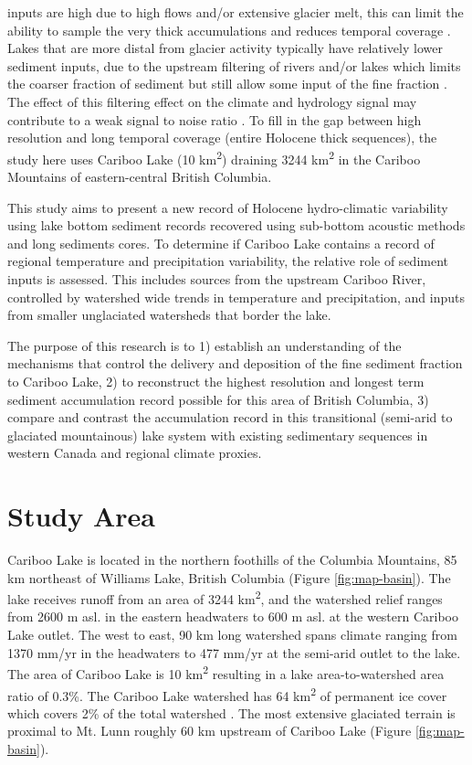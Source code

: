 \documentclass[Royal,times,doublespace,sageh]{sagej}
\begin{document}
inputs are high due to high flows and/or extensive glacier melt, this
can limit the ability to sample the very thick accumulations and reduces
temporal coverage \citep[e.g.][]{Desloges1994d}. Lakes that are more
distal from glacier activity typically have relatively lower sediment
inputs, due to the upstream filtering of rivers and/or lakes which
limits the coarser fraction of sediment but still allow some input of
the fine fraction \citep{Hodder2007}. The effect of this filtering
effect on the climate and hydrology signal may contribute to a weak
signal to noise ratio \citep{Jerolmack2010}. To fill in the gap between
high resolution and long temporal coverage (entire Holocene thick
sequences), the study here uses Cariboo Lake (10 km\textsuperscript{2})
draining 3244 km\textsuperscript{2} in the Cariboo Mountains of
eastern-central British Columbia.

This study aims to present a new record of Holocene hydro-climatic
variability using lake bottom sediment records recovered using
sub-bottom acoustic methods and long sediments cores. To determine if
Cariboo Lake contains a record of regional temperature and precipitation
variability, the relative role of sediment inputs is assessed. This
includes sources from the upstream Cariboo River, controlled by
watershed wide trends in temperature and precipitation, and inputs from
smaller unglaciated watersheds that border the lake.

The purpose of this research is to 1) establish an understanding of the
mechanisms that control the delivery and deposition of the fine sediment
fraction to Cariboo Lake, 2) to reconstruct the highest resolution and
longest term sediment accumulation record possible for this area of
British Columbia, 3) compare and contrast the accumulation record in
this transitional (semi-arid to glaciated mountainous) lake system with
existing sedimentary sequences in western Canada and regional climate
proxies.

\hypertarget{study-area}{%
\section{Study Area}\label{study-area}}

Cariboo Lake is located in the northern foothills of the Columbia
Mountains, 85 km northeast of Williams Lake, British Columbia (Figure
\ref{fig:map-basin}). The lake receives runoff from an area of 3244
km\textsuperscript{2}, and the watershed relief ranges from 2600 m asl.
in the eastern headwaters to 600 m asl. at the western Cariboo Lake
outlet. The west to east, 90 km long watershed spans climate ranging
from 1370 mm/yr in the headwaters to 477 mm/yr at the semi-arid outlet
to the lake. The area of Cariboo Lake is 10 km\textsuperscript{2}
resulting in a lake area-to-watershed area ratio of 0.3\%. The Cariboo
Lake watershed has 64 km\textsuperscript{2} of permanent ice cover which
covers 2\% of the total watershed \citep{Bolch2008}. The most extensive
glaciated terrain is proximal to Mt. Lunn roughly 60 km upstream of
Cariboo Lake (Figure \ref{fig:map-basin}).
\end{document}
